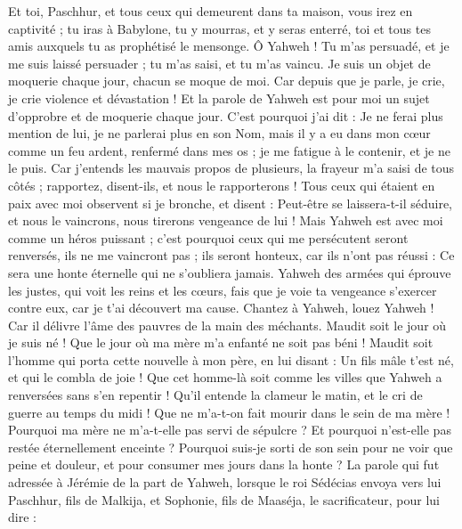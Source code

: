 \begin{multicols}{2}
Et toi, Paschhur, et tous ceux qui demeurent dans ta maison, vous irez en captivité ; tu iras à Babylone, tu y mourras, et y seras enterré, toi et tous tes amis auxquels tu as prophétisé le mensonge.
Ô Yahweh ! Tu m'as persuadé, et je me suis laissé persuader ; tu m'as saisi, et tu m'as vaincu. Je suis un objet de moquerie chaque jour, chacun se moque de moi.
Car depuis que je parle, je crie, je crie violence et dévastation ! Et la parole de Yahweh est pour moi un sujet d'opprobre et de moquerie chaque jour.
C'est pourquoi j'ai dit : Je ne ferai plus mention de lui, je ne parlerai plus en son Nom, mais il y a eu dans mon cœur comme un feu ardent, renfermé dans mes os ; je me fatigue à le contenir, et je ne le puis.
Car j'entends les mauvais propos de plusieurs, la frayeur m'a saisi de tous côtés ; rapportez, disent-ils, et nous le rapporterons ! Tous ceux qui étaient en paix avec moi observent si je bronche, et disent : Peut-être se laissera-t-il séduire, et nous le vaincrons, nous tirerons vengeance de lui !
Mais Yahweh est avec moi comme un héros puissant ; c'est pourquoi ceux qui me persécutent seront renversés, ils ne me vaincront pas ; ils seront honteux, car ils n'ont pas réussi : Ce sera une honte éternelle qui ne s'oubliera jamais.
Yahweh des armées qui éprouve les justes, qui voit les reins et les cœurs, fais que je voie ta vengeance s'exercer contre eux, car je t'ai découvert ma cause.
Chantez à Yahweh, louez Yahweh ! Car il délivre l'âme des pauvres de la main des méchants.
Maudit soit le jour où je suis né ! Que le jour où ma mère m'a enfanté ne soit pas béni !
Maudit soit l'homme qui porta cette nouvelle à mon père, en lui disant : Un fils mâle t'est né, et qui le combla de joie !
Que cet homme-là soit comme les villes que Yahweh a renversées sans s'en repentir ! Qu'il entende la clameur le matin, et le cri de guerre au temps du midi !
Que ne m'a-t-on fait mourir dans le sein de ma mère ! Pourquoi ma mère ne m'a-t-elle pas servi de sépulcre ? Et pourquoi n'est-elle pas restée éternellement enceinte ?
Pourquoi suis-je sorti de son sein pour ne voir que peine et douleur, et pour consumer mes jours dans la honte ?
\VerseOne{}La parole qui fut adressée à Jérémie de la part de Yahweh, lorsque le roi Sédécias envoya vers lui Paschhur, fils de Malkija, et Sophonie, fils de Maaséja, le sacrificateur, pour lui dire :

\end{multicols}
